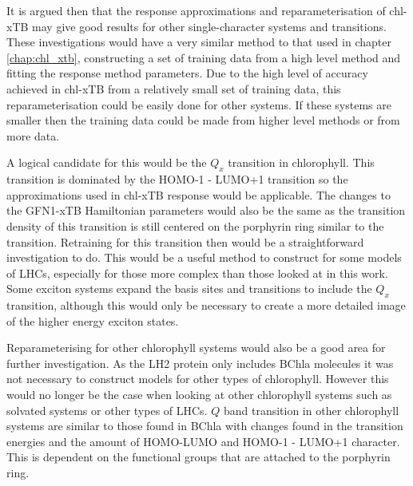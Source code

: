 It is argued then that the response approximations and reparameterisation of chl-xTB
may give good results for other single-character systems and transitions. These 
investigations would have a very similar method to that used in chapter \ref{chap:chl_xtb},
constructing a set of training data from a high level method and fitting the response
method parameters. Due to the high level of accuracy achieved in chl-xTB from a
relatively small set of training data, this reparameterisation could be easily 
done for other systems. If these systems are smaller then the training data could 
be made from higher level methods or from more data. 

A logical candidate for this would be the $Q_x$ transition in chlorophyll. This 
transition is dominated by the HOMO-1 - LUMO+1 transition so the approximations
used in chl-xTB response would be applicable. The changes to the GFN1-xTB Hamiltonian
parameters would also be the same as the transition density of this transition is
still centered on the porphyrin ring similar to the \Qy transition. Retraining for
this transition then would be a straightforward investigation to do. This would 
be a useful method to construct for some models of LHCs, especially for those more
complex than those looked at in this work. Some exciton systems expand the basis
sites and transitions to include the $Q_x$ transition, although this would only
be necessary to create a more detailed image of the higher energy exciton states.

Reparameterising for other chlorophyll systems would also be a good area for further
investigation. As the LH2 protein only includes BChla molecules it was not necessary
to construct models for other types of chlorophyll. However this would no longer 
be the case when looking at other chlorophyll systems such as solvated systems or
other types of LHCs. $Q$ band transition in other chlorophyll systems are similar
to those found in BChla with changes found in the transition energies and the amount
of HOMO-LUMO and HOMO-1 - LUMO+1 character. This is dependent on the functional 
groups that are attached to the porphyrin ring.

